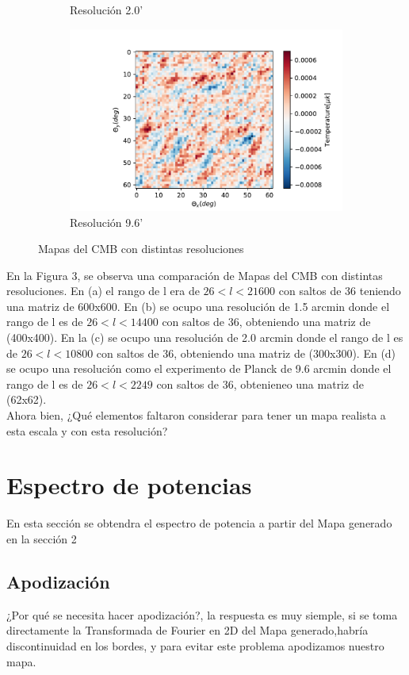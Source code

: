 \documentclass[a4paper]{article}
\begin{document}
\begin{figure}
\begin{subfigure}[b]{0.45\linewidth}
\caption{Resolución 2.0'}
\label{fig:CMB2ma}
\end{subfigure}
\begin{subfigure}[b]{0.45\linewidth}
\includegraphics[width=\linewidth]{CMB96ma.pdf}
\caption{Resolución 9.6'}
\label{fig:CMB2ma}
\end{subfigure}
\caption{Mapas del CMB con distintas resoluciones}
\label{fig:westminster}
\end{figure}

En la Figura 3, se observa una comparación de Mapas del CMB con distintas resoluciones. 
En (a) el rango de l era de $26<l<21600$ con saltos de 36 teniendo una matriz de 600x600. 
En (b) se ocupo una resolución de 1.5 arcmin donde el rango de l es  de $26<l<14400$  con saltos de 36, obteniendo una matriz de (400x400).
En la (c) se ocupo una resolución de 2.0 arcmin donde el rango de l es de $ 26<l<10800$ con saltos de 36, obteniendo una matriz de (300x300).
En (d) se ocupo una resolución como el experimento de Planck de 9.6 arcmin donde el rango de l es de $26<l<2249$ con saltos de 36, obtenieneo una matriz de (62x62).\\

Ahora bien, ¿Qué elementos faltaron considerar para tener un mapa realista a esta escala y con esta resolución?


\section{Espectro de potencias}
En esta sección se obtendra el espectro de potencia a partir del Mapa generado en la sección 2

\subsection{Apodización}
¿Por qué se necesita hacer apodización?, la respuesta es muy siemple, si se toma directamente la Transformada de Fourier en 2D del Mapa generado,habría discontinuidad en los bordes, y para evitar este problema apodizamos nuestro mapa.
\end{document}
